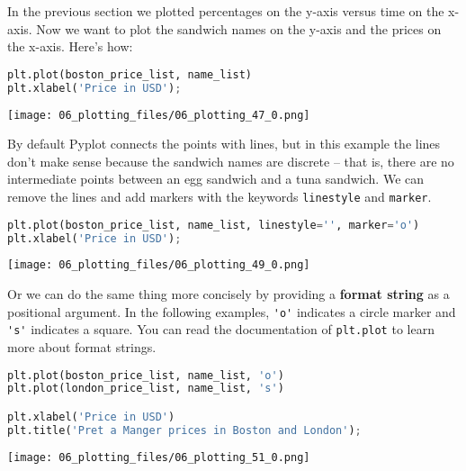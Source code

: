 In the previous section we plotted percentages on the y-axis versus time
on the x-axis. Now we want to plot the sandwich names on the y-axis and
the prices on the x-axis. Here's how:

\begin{lstlisting}[language=Python,style=source]
plt.plot(boston_price_list, name_list)
plt.xlabel('Price in USD');
\end{lstlisting}

\begin{center}
\texttt{[image: 06\_plotting\_files/06\_plotting\_47\_0.png]}
\end{center}

By default Pyplot connects the points with lines, but in this example
the lines don't make sense because the sandwich names are discrete --
that is, there are no intermediate points between an egg sandwich and a
tuna sandwich. We can remove the lines and add markers with the keywords
\passthrough{\lstinline!linestyle!} and
\passthrough{\lstinline!marker!}.

\begin{lstlisting}[language=Python,style=source]
plt.plot(boston_price_list, name_list, linestyle='', marker='o')
plt.xlabel('Price in USD');
\end{lstlisting}

\begin{center}
\texttt{[image: 06\_plotting\_files/06\_plotting\_49\_0.png]}
\end{center}

Or we can do the same thing more concisely by providing a \textbf{format
string} as a positional argument. In the following examples,
\passthrough{\lstinline!'o'!} indicates a circle marker and
\passthrough{\lstinline!'s'!} indicates a square. You can read the
documentation of \passthrough{\lstinline!plt.plot!} to learn more about
format strings.

\begin{lstlisting}[language=Python,style=source]
plt.plot(boston_price_list, name_list, 'o')
plt.plot(london_price_list, name_list, 's')

plt.xlabel('Price in USD')
plt.title('Pret a Manger prices in Boston and London');
\end{lstlisting}

\begin{center}
\texttt{[image: 06\_plotting\_files/06\_plotting\_51\_0.png]}
\end{center}


